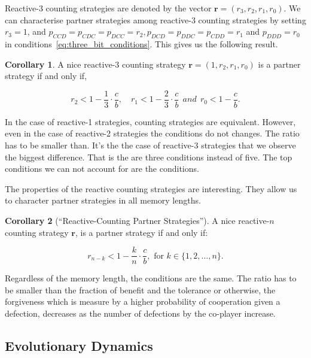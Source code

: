\documentclass{article}
\theoremstyle{definition}
\newtheorem{corollary}{Corollary}[theorem]
\begin{document}
Reactive-3 counting strategies are denoted by the vector $\mathbf{r}=(r_3,
r_2, r_1, r_0)$. We can characterise partner strategies among reactive-3
counting strategies by setting $r_3 = 1$, and $p_{CCD} = p_{CDC} = p_{DCC} =
r_2, p_{DCD} = p_{DDC} = p_{CDD} = r_1$ and $p_{DDD} = r_0$ in
conditions~\eqref{eq:three_bit_conditions}. This gives us the following result.

\begin{corollary}
A nice reactive-3 counting strategy $\mathbf{r} = (1, r_2, r_1, r_0)$ is a partner strategy if and only if,

\begin{equation}\label{eq:counting_three_bit_conditions}
  \displaystyle r_2 < 1- \frac{1}{3} \cdot \frac{c}{b}, \quad r_1 < 1- \frac{2}{3} \cdot \frac{c}{b} ~~and~~ r_0 < 1\!-\! \frac{c}{b}.
\end{equation}
\end{corollary}

In the case of reactive-1 strategies, counting strategies are equivalent.
However, even in the case of reactive-2 strategies the conditions do not
changes. The ratio has to be smaller than. It's the the case of reactive-3
strategies that we observe the biggest difference. That is the are three
conditions instead of five. The top conditions we can not account for are the
conditions.

The properties of the reactive counting strategies are interesting. They allow
us to character partner strategies in all memory lengths.

\begin{corollary}[``Reactive-Counting Partner Strategies'']\label{corollary:reactive_counting_partner_strategies}
A nice reactive-$n$ counting strategy $\mathbf{r}$,
is a partner strategy if and only if:

\begin{equation}
  r_{n - k} < 1 - \frac{k}{n} \cdot \frac{c}{b}, \text{ for } k \in \{1, 2, \dots, n\}.
\end{equation}
\end{corollary}

Regardless of the memory length, the conditions are the same. The ratio has to
be smaller than the fraction of benefit and the tolerance or otherwise, the
forgiveness which is measure by a higher probability of cooperation given a
defection, decreases as the number of defections by the co-player increase.


\subsection{Evolutionary Dynamics}
\end{document}
